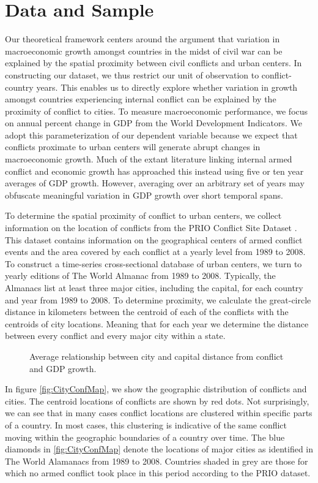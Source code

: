 \section{Data and Sample}
\label{empirics}

Our theoretical framework centers around the argument that variation in macroeconomic growth amongst countries in the midst of civil war can be explained by the spatial proximity between civil conflicts and urban centers. In constructing our dataset, we thus restrict our unit of observation to conflict-country years. This enables us to directly explore whether variation in growth amongst countries experiencing internal conflict can be explained by the proximity of conflict to cities. 
To measure macroeconomic performance, we focus on annual percent change in GDP from the World Development Indicators. We adopt this parameterization of our dependent variable because we expect that conflicts proximate to urban centers will generate abrupt changes in macroeconomic growth. Much of the extant literature linking internal armed conflict and economic growth has approached this instead using five or ten year averages of GDP growth. However, averaging over an arbitrary set of years may obfuscate meaningful variation in GDP growth over short temporal spans.

To determine the spatial proximity of conflict to urban centers, we collect information on the location of conflicts from the PRIO Conflict Site Dataset \citep{hallberg:2012}. This dataset contains information on the geographical centers of  armed conflict events and the area covered by each conflict at a yearly level from 1989 to 2008. To construct a time-series cross-sectional database of urban centers, we turn to yearly editions of The World Almanac from 1989 to 2008. Typically, the Almanacs list at least three major cities, including the capital, for each country and year from 1989 to 2008. To determine proximity, we calculate the great-circle distance in kilometers between the centroid of each of the conflicts with the centroids of city locations. Meaning that for each year we determine the distance between every conflict and every major city within a state. 

\begin{figure}
	\centering
	\resizebox{.8\textwidth}{!}{}
	\caption{Average relationship between city and capital distance from conflict and GDP growth.}
	\label{fig:distGdp}
\end{figure}

In figure \ref{fig:CityConfMap}, we show the geographic distribution of conflicts and cities. The centroid locations of conflicts are shown by red dots. Not surprisingly, we can see that in many cases conflict locations are clustered within specific parts of a country. In most cases, this clustering is indicative of the same conflict moving within the geographic boundaries of a country over time. The blue diamonds in \ref{fig:CityConfMap} denote the locations of major cities as identified in The World Alamanacs from 1989 to 2008. Countries shaded in grey are those for which no armed conflict took place in this period according to the PRIO dataset.  

